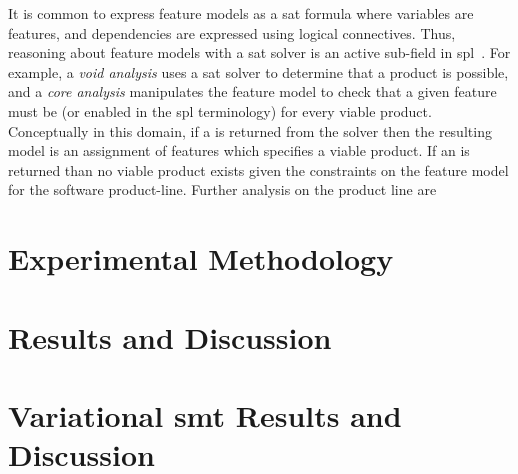 It is common to express feature models as a \ac{sat} formula where variables are
features, and dependencies are expressed using logical connectives. Thus,
reasoning about feature models with a \ac{sat} solver is an active sub-field in
\acl{spl}~\cite{BSRC10,GBT+19,BSTRC06,TAK+:SE15}. For example, a \emph{void
  analysis} uses a \ac{sat} solver to determine that a product is possible, and
a \emph{core analysis} manipulates the feature model to check that a given
feature must be \tru{} (or enabled in the \ac{spl} terminology) for every viable
product. Conceptually in this domain, if a  is returned from the solver
then the resulting model is an assignment of features which specifies a viable
product. If an  is returned than no viable product exists given the
constraints on the feature model for the software product-line. Further analysis
on the product line are

\section{Experimental Methodology}

%
\section{Results and Discussion}


\section{Variational \ac{smt} Results and Discussion}


